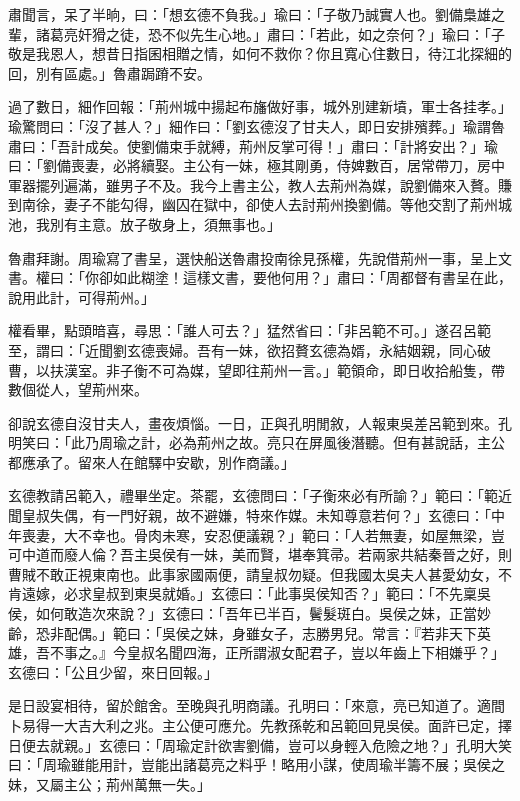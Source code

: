 肅聞言，呆了半晌，曰：「想玄德不負我。」瑜曰：「子敬乃誠實人也。劉備梟雄之輩，諸葛亮奸猾之徒，恐不似先生心地。」肅曰：「若此，如之奈何？」瑜曰：「子敬是我恩人，想昔日指囷相贈之情，如何不救你？你且寬心住數日，待江北探細的回，別有區處。」魯肅跼蹐不安。

過了數日，細作回報：「荊州城中揚起布旛做好事，城外別建新墳，軍士各挂孝。」瑜驚問曰：「沒了甚人？」細作曰：「劉玄德沒了甘夫人，即日安排殯葬。」瑜謂魯肅曰：「吾計成矣。使劉備束手就縛，荊州反掌可得！」肅曰：「計將安出？」瑜曰：「劉備喪妻，必將續娶。主公有一妹，極其剛勇，侍婢數百，居常帶刀，房中軍器擺列遍滿，雖男子不及。我今上書主公，教人去荊州為媒，說劉備來入贅。賺到南徐，妻子不能勾得，幽囚在獄中，卻使人去討荊州換劉備。等他交割了荊州城池，我別有主意。放子敬身上，須無事也。」

魯肅拜謝。周瑜寫了書呈，選快船送魯肅投南徐見孫權，先說借荊州一事，呈上文書。權曰：「你卻如此糊塗！這樣文書，要他何用？」肅曰：「周都督有書呈在此，說用此計，可得荊州。」

權看畢，點頭暗喜，尋思：「誰人可去？」猛然省曰：「非呂範不可。」遂召呂範至，謂曰：「近聞劉玄德喪婦。吾有一妹，欲招贅玄德為婿，永結姻親，同心破曹，以扶漢室。非子衡不可為媒，望即往荊州一言。」範領命，即日收拾船隻，帶數個從人，望荊州來。

卻說玄德自沒甘夫人，畫夜煩惱。一日，正與孔明閒敘，人報東吳差呂範到來。孔明笑曰：「此乃周瑜之計，必為荊州之故。亮只在屏風後潛聽。但有甚說話，主公都應承了。留來人在館驛中安歇，別作商議。」

玄德教請呂範入，禮畢坐定。茶罷，玄德問曰：「子衡來必有所諭？」範曰：「範近聞皇叔失偶，有一門好親，故不避嫌，特來作媒。未知尊意若何？」玄德曰：「中年喪妻，大不幸也。骨肉未寒，安忍便議親？」範曰：「人若無妻，如屋無梁，豈可中道而廢人倫？吾主吳侯有一妹，美而賢，堪奉箕帚。若兩家共結秦晉之好，則曹賊不敢正視東南也。此事家國兩便，請皇叔勿疑。但我國太吳夫人甚愛幼女，不肯遠嫁，必求皇叔到東吳就婚。」玄德曰：「此事吳侯知否？」範曰：「不先稟吳侯，如何敢造次來說？」玄德曰：「吾年已半百，鬢髮斑白。吳侯之妹，正當妙齡，恐非配偶。」範曰：「吳侯之妹，身雖女子，志勝男兒。常言：『若非天下英雄，吾不事之。』今皇叔名聞四海，正所謂淑女配君子，豈以年齒上下相嫌乎？」玄德曰：「公且少留，來日回報。」

是日設宴相待，留於館舍。至晚與孔明商議。孔明曰：「來意，亮已知道了。適間卜易得一大吉大利之兆。主公便可應允。先教孫乾和呂範回見吳侯。面許已定，擇日便去就親。」玄德曰：「周瑜定計欲害劉備，豈可以身輕入危險之地？」孔明大笑曰：「周瑜雖能用計，豈能出諸葛亮之料乎！略用小謀，使周瑜半籌不展；吳侯之妹，又屬主公；荊州萬無一失。」

